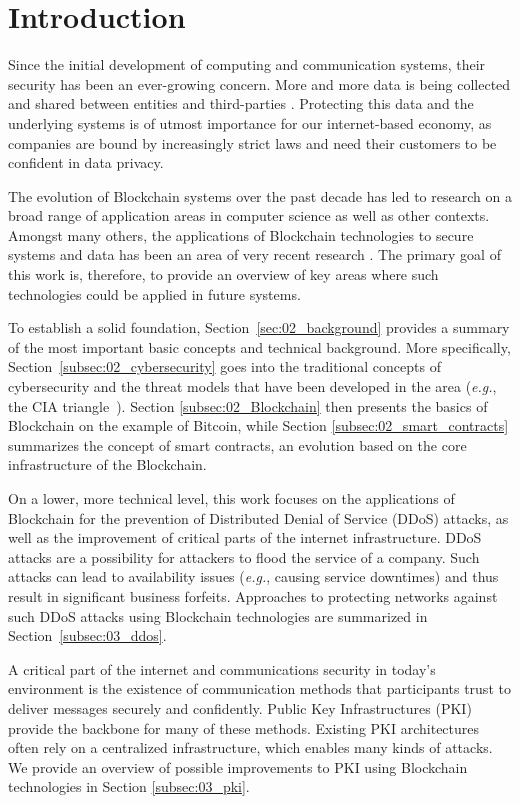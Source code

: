 \section{Introduction}

Since the initial development of computing and communication systems, their security has been an ever-growing concern. More and more data is being collected and shared between entities and third-parties \citep{Plageras2017}. Protecting this data and the underlying systems is of utmost importance for our internet-based economy, as companies are bound by increasingly strict laws and need their customers to be confident in data privacy.

The evolution of Blockchain systems over the past decade has led to research on a broad range of application areas in computer science as well as other contexts. Amongst many others, the applications of Blockchain technologies to secure systems and data has been an area of very recent research \citep{Huckle2016}. The primary goal of this work is, therefore, to provide an overview of key areas where such technologies could be applied in future systems.

To establish a solid foundation, Section~\ref{sec:02_background} provides a summary of the most important basic concepts and technical background. More specifically, Section~\ref{subsec:02_cybersecurity} goes into the traditional concepts of cybersecurity and the threat models that have been developed in the area (\textit{e.g.}, the CIA triangle~\cite{whitman2011principles}). Section \ref{subsec:02_Blockchain} then presents the basics of Blockchain on the example of Bitcoin, while Section \ref{subsec:02_smart_contracts} summarizes the concept of smart contracts, an evolution based on the core infrastructure of the Blockchain.

On a lower, more technical level, this work focuses on the applications of Blockchain for the prevention of Distributed Denial of Service (DDoS) attacks, as well as the improvement of critical parts of the internet infrastructure. DDoS attacks are a possibility for attackers to flood the service of a company. Such attacks can lead to availability issues (\textit{e.g.}, causing service downtimes) and thus result in significant business forfeits. Approaches to protecting networks against such DDoS attacks using Blockchain technologies are summarized in Section~\ref{subsec:03_ddos}.

A critical part of the internet and communications security in today's environment is the existence of communication methods that participants trust to deliver messages securely and confidently. Public Key Infrastructures (PKI) provide the backbone for many of these methods. Existing PKI architectures often rely on a centralized infrastructure, which enables many kinds of attacks. We provide an overview of possible improvements to PKI using Blockchain technologies in Section \ref{subsec:03_pki}.

